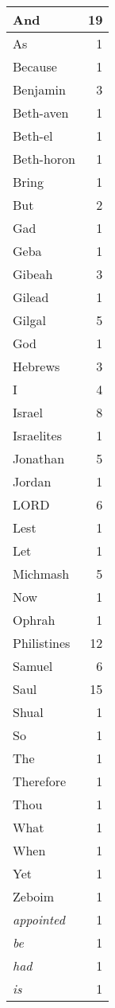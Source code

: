 \begin{center}
\begin{longtable}{l|r}
\hline \hline
\endlastfoot
And & 19 \\ \hline
As & 1 \\ \hline
Because & 1 \\ \hline
Benjamin & 3 \\ \hline
Beth-aven & 1 \\ \hline
Beth-el & 1 \\ \hline
Beth-horon & 1 \\ \hline
Bring & 1 \\ \hline
But & 2 \\ \hline
Gad & 1 \\ \hline
Geba & 1 \\ \hline
Gibeah & 3 \\ \hline
Gilead & 1 \\ \hline
Gilgal & 5 \\ \hline
God & 1 \\ \hline
Hebrews & 3 \\ \hline
I & 4 \\ \hline
Israel & 8 \\ \hline
Israelites & 1 \\ \hline
Jonathan & 5 \\ \hline
Jordan & 1 \\ \hline
LORD & 6 \\ \hline
Lest & 1 \\ \hline
Let & 1 \\ \hline
Michmash & 5 \\ \hline
Now & 1 \\ \hline
Ophrah & 1 \\ \hline
Philistines & 12 \\ \hline
Samuel & 6 \\ \hline
Saul & 15 \\ \hline
Shual & 1 \\ \hline
So & 1 \\ \hline
The & 1 \\ \hline
Therefore & 1 \\ \hline
Thou & 1 \\ \hline
What & 1 \\ \hline
When & 1 \\ \hline
Yet & 1 \\ \hline
Zeboim & 1 \\ \hline
\emph{appointed} & 1 \\ \hline
\emph{be} & 1 \\ \hline
\emph{had} & 1 \\ \hline
\emph{is} & 1 \\ \hline

\end{longtable}
\end{center}

